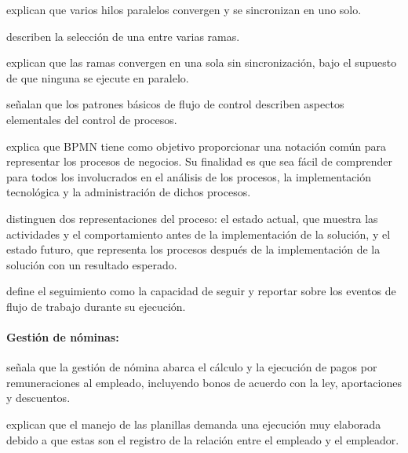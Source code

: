  \textcite[11]{vanderaalst2003workflow} explican que varios hilos paralelos convergen y se sincronizan en uno solo.

 \textcite[11]{vanderaalst2003workflow} describen la selección de una entre varias ramas.

 \textcite[12]{vanderaalst2003workflow} explican que las ramas convergen en una sola sin sincronización, 
bajo el supuesto de que ninguna se ejecute en paralelo.

 \textcite[10]{vanderaalst2003workflow} señalan que los patrones básicos de flujo de 
control describen aspectos elementales del control de procesos.

 \textcite[p.~1, sección~1.1]{omg2013bpmn} explica que BPMN tiene como objetivo proporcionar una 
notación común para representar los procesos de negocios. Su finalidad es que sea fácil de comprender para todos los involucrados en el análisis de los procesos, 
la implementación tecnológica y la administración de dichos procesos.

\textcite[17--23]{beltran2021automatizacion} distinguen dos representaciones del proceso: el estado actual, que muestra las actividades y 
el comportamiento antes de la implementación de la solución, y el estado futuro, que representa los procesos después de la implementación de la solución con un resultado esperado.

 \textcite[56]{wfmc1999glosario} define el seguimiento como la capacidad de seguir y 
reportar sobre los eventos de flujo de trabajo durante su ejecución.

\paragraph{Gestión de nóminas:}

\textcite[p.~55, sección~3.2.1]{quispe2025implementacion} señala que la gestión de nómina abarca el cálculo y la ejecución de pagos por remuneraciones al empleado, 
incluyendo bonos de acuerdo con la ley, aportaciones y descuentos.

\textcite[p.~25, sección~1.2]{fernandez2023implementacion} explican que el manejo de las planillas demanda una ejecución muy elaborada debido a que estas 
son el registro de la relación entre el empleado y el empleador.

